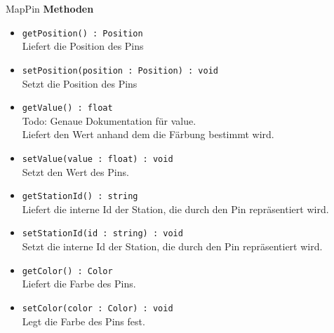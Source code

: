     \begin{Class}{MapPin}
        \textbf{Methoden}
        \begin{itemize}
            \item \texttt{getPosition() : Position}
            \\ Liefert die Position des Pins
            \item \texttt{setPosition(position : Position) : void}
            \\ Setzt die Position des Pins

            \bigskip
            \item \texttt{getValue() : float}
            \\ Todo: Genaue Dokumentation für value.
            \\ Liefert den Wert anhand dem die Färbung bestimmt wird.
            \item \texttt{setValue(value : float) : void}
            \\ Setzt den Wert des Pins.

            \bigskip
            \item \texttt{getStationId() : string}
            \\ Liefert die interne Id der Station, die durch den Pin repräsentiert wird.
            \item \texttt{setStationId(id : string) : void}
            \\ Setzt die interne Id der Station, die durch den Pin repräsentiert wird.

            \bigskip
            \item \texttt{getColor() : Color}
            \\ Liefert die Farbe des Pins.
            \item \texttt{setColor(color : Color) : void}
            \\ Legt die Farbe des Pins fest.
        \end{itemize}
    \end{Class}

